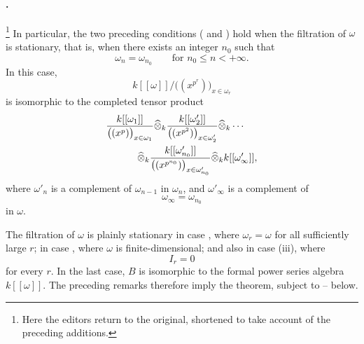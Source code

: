 
\paragraph{.}
\label{sga3:VIIB:5.2.1.C}
\footnote{\label{sga3:VIIB:nde:157}Here the editors return to the
original, shortened to take account of the preceding additions.}
In particular, the two preceding conditions \textup{( and
)} hold when the filtration of \(\omega\) is stationary,
that is, when there exists an integer \(n_0\) such that
\[
  \omega_n=\omega_{n_0}
  \qquad
  \text{for }n_0\leq n<+\infty.
\]
In this case,
\[
  k[[\omega]]
  \big/
  \bigl((x^{p^r})\bigr)_{x\in\omega_r}
\]
is isomorphic to the completed tensor product
\[
\begin{aligned}
  &
  \frac{k[[\omega_1]]}
       {\bigl((x^p)\bigr)_{x\in\omega_1}}
  \widehat\otimes_k
  \frac{k[[\omega'_2]]}
       {\bigl((x^{p^2})\bigr)_{x\in\omega'_2}}
  \widehat\otimes_k\cdots
  \\
  &\hspace{3.2em}
  {}\widehat\otimes_k
  \frac{k[[\omega'_{n_0}]]}
       {\bigl((x^{p^{n_0}})\bigr)_{x\in\omega'_{n_0}}}
  \widehat\otimes_k
  k[[\omega'_\infty]],
\end{aligned}
\]
where \(\omega'_n\) is a complement of \(\omega_{n-1}\) in
\(\omega_n\), and \(\omega'_\infty\) is a complement of
\[
  \omega_\infty=\omega_{n_0}
\]
in \(\omega\).

The filtration of \(\omega\) is plainly stationary in case
\textup{}, where \(\omega_r=\omega\) for all sufficiently
large \(r\); in case \textup{}, where \(\omega\) is
finite-dimensional; and also in case \textup{(iii)}, where
\[
  I_r=0
\]
for every \(r\). In the last case, \(B\) is isomorphic to the
formal power series algebra \(k[[\omega]]\). The preceding remarks
therefore imply the theorem, subject to -- below.
